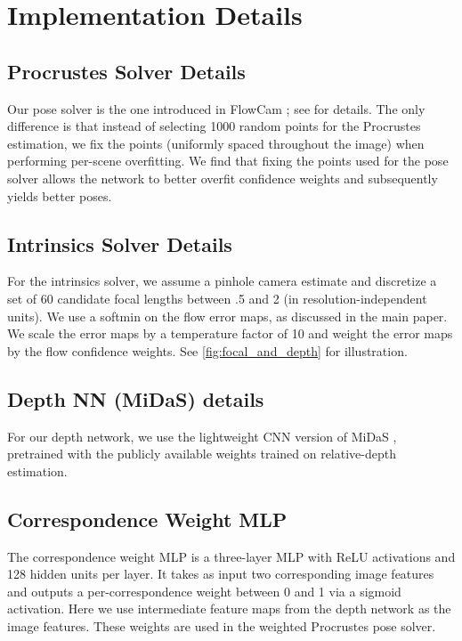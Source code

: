 \section{Implementation Details}


\subsection{Procrustes Solver Details}

Our pose solver is the one introduced in FlowCam \cite{smith2023flowcam}; see \cite{smith2023flowcam} for details. 
The only difference is that instead of selecting 1000 random points for the Procrustes estimation, we fix the points (uniformly spaced throughout the image) when performing per-scene overfitting.
We find that fixing the points used for the pose solver allows the network to better overfit confidence weights and subsequently yields better poses.

\subsection{Intrinsics Solver Details}
For the intrinsics solver, we assume a pinhole camera estimate and discretize a set of 60 candidate focal lengths between .5 and 2 (in resolution-independent units).
We use a softmin on the flow error maps, as discussed in the main paper.
We scale the error maps by a temperature factor of 10 and weight the error maps by the flow confidence weights.
See \cref{fig:focal_and_depth} for illustration.

\subsection{Depth NN (MiDaS) details}
For our depth network, we use the lightweight CNN version of MiDaS \cite{ranftl2020towards}, pretrained with the publicly available weights trained on relative-depth estimation.

\subsection{Correspondence Weight MLP}
The correspondence weight MLP is a three-layer MLP with ReLU activations and 128 hidden units per layer.
It takes as input two corresponding image features and outputs a per-correspondence weight between 0 and 1 via a sigmoid activation.
Here we use intermediate feature maps from the depth network as the image features.
These weights are used in the weighted Procrustes pose solver.
